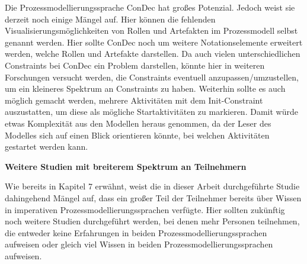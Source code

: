 Die Prozessmodellierungssprache ConDec hat großes Potenzial. Jedoch weist sie derzeit noch einige Mängel auf. Hier können die fehlenden Visualisierungsmöglichkeiten von Rollen und Artefakten im Prozessmodell selbst genannt werden. Hier sollte ConDec noch um weitere Notationselemente erweitert werden, welche Rollen und Artefakte darstellen.\newline
Da auch vielen unterschiedlichen Constraints bei ConDec ein Problem darstellen, könnte hier in weiteren Forschungen versucht werden, die Constraints eventuell anzupassen/umzustellen, um ein kleineres Spektrum an Constraints zu haben.\newline
Weiterhin sollte es auch möglich gemacht werden, mehrere Aktivitäten mit dem Init-Constraint auszustatten, um diese als mögliche Startaktivitäten zu markieren. Damit würde etwas Komplexität aus den Modellen heraus genommen, da der Leser des Modelles sich auf einen Blick orientieren könnte, bei welchen Aktivitäten gestartet werden kann.\newline

\textbf{Weitere Studien mit breiterem Spektrum an Teilnehmern}

Wie bereits in Kapitel 7 erwähnt, weist die in dieser Arbeit durchgeführte Studie dahingehend Mängel auf, dass ein großer Teil der Teilnehmer bereits über Wissen in imperativen Prozessmodellierungssprachen verfügte. Hier sollten zukünftig noch weitere Studien durchgeführt werden, bei denen mehr Personen teilnehmen, die entweder keine Erfahrungen in beiden Prozessmodellierungssprachen aufweisen oder gleich viel Wissen in beiden Prozessmodellierungssprachen aufweisen.\newline




